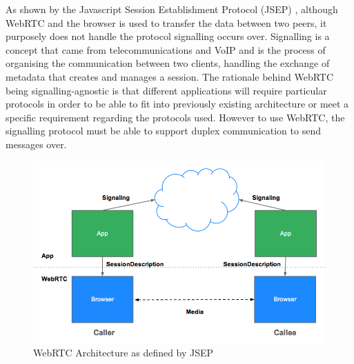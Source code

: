 \documentclass[]{report}
\begin{document}
	As shown by the Javascript Session Establishment Protocol (JSEP) \cite{JSEP}, although WebRTC and the browser is used to transfer the data between two peers, it purposely does not handle the protocol signalling occurs over. Signalling is a concept that came from telecommunications and VoIP and is the process of organising the communication between two clients, handling the exchange of metadata that creates and manages a session. The rationale behind WebRTC being signalling-agnostic is that different applications will require particular protocols in order to be able to fit into previously existing architecture or meet a specific requirement regarding the protocols used. However to use WebRTC, the signalling protocol must be able to support duplex communication to send messages over.
	
	\begin{figure}[H]
		\centering
		\caption{WebRTC Architecture as defined by JSEP \cite{JSEP}}
		\includegraphics[scale=0.4]{jsep.png}
	\end{figure}
	
\end{document}

